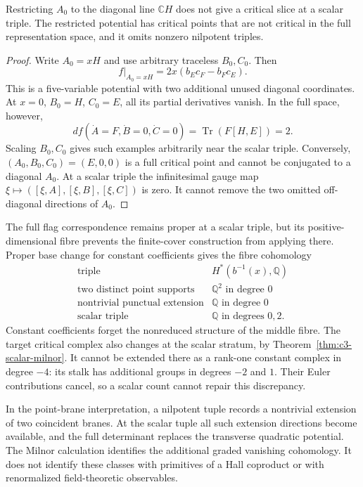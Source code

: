 \begin{proposition}
\label{prop:c3-collision-diagonal-failure}
Restricting $A_0$ to the diagonal line $\mathbb CH$ does not give
a critical slice at a scalar triple. The restricted potential
has critical points that are not critical in the full representation
space, and it omits nonzero nilpotent triples.
\end{proposition}

\begin{proof}
Write $A_0=xH$ and use arbitrary traceless $B_0,C_0$. Then
\[
 f|_{A_0=xH}=2x(b_Ec_F-b_Fc_E).
\]
This is a five-variable potential with two additional unused
diagonal coordinates. At $x=0$, $B_0=H$, $C_0=E$, all its partial
derivatives vanish. In the full space, however,
\[
 df(\dot A=F,\dot B=0,\dot C=0)
 =\operatorname{Tr}(F[H,E])=2.
\]
Scaling $B_0,C_0$ gives such examples arbitrarily near the scalar
triple. Conversely, $(A_0,B_0,C_0)=(E,0,0)$ is a full critical point
and cannot be conjugated to a diagonal $A_0$.
At a scalar triple the infinitesimal gauge map
$\xi\mapsto([\xi,A],[\xi,B],[\xi,C])$ is zero. It cannot remove
the two omitted off-diagonal directions of $A_0$.
\end{proof}

The full flag correspondence remains proper at a scalar triple,
but its positive-dimensional fibre prevents the finite-cover
construction from applying there. Proper base change for constant
coefficients gives the fibre cohomology
\[
\begin{array}{c|c}
\text{triple}&H^*(b^{-1}(x),\mathbb Q)\\\hline
\text{two distinct point supports}&\mathbb Q^2\text{ in degree }0\\
\text{nontrivial punctual extension}&\mathbb Q\text{ in degree }0\\
\text{scalar triple}&\mathbb Q\text{ in degrees }0,2.
\end{array}
\]
Constant coefficients forget the nonreduced structure of the
middle fibre. The target critical complex also changes at the
scalar stratum, by Theorem~\ref{thm:c3-scalar-milnor}.
It cannot be extended there as a rank-one constant complex in
degree $-4$: its stalk has additional groups in degrees $-2$ and $1$.
Their Euler contributions cancel, so a scalar count cannot repair
this discrepancy.

In the point-brane interpretation, a nilpotent tuple records a
nontrivial extension of two coincident branes. At the scalar tuple
all such extension directions become available, and the full
determinant replaces the transverse quadratic potential.
The Milnor calculation identifies the additional graded vanishing
cohomology. It does not identify these classes with primitives of
a Hall coproduct or with renormalized field-theoretic observables.

